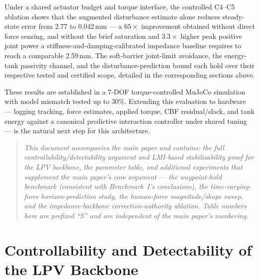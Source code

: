 \documentclass[journal]{IEEEtran}
\begin{document}
Under a shared actuator budget and torque interface, the controlled C4--C5
ablation shows that the augmented disturbance estimate alone reduces
steady-state error from 2.77 to 0.042\,mm --- a $65\times$ improvement
obtained without direct force sensing, and without the brief saturation and
$3.3\times$ higher peak positive joint power a stiffness-and-damping-calibrated impedance baseline requires
to reach a comparable 2.59\,mm. The soft-barrier joint-limit avoidance, the
energy-tank passivity channel, and the disturbance-prediction bound each hold
over their respective tested and certified scope, detailed in the
corresponding sections above.

These results are established in a 7-DOF torque-controlled MuJoCo simulation
with model mismatch tested up to $30\%$. Extending this evaluation to
hardware --- logging tracking, force estimates, applied torque, CBF
residual/slack, and tank energy against a canonical predictive interaction
controller under shared tuning --- is the natural next step for this
architecture.


\clearpage
\setcounter{section}{0}
\setcounter{table}{0}
\setcounter{figure}{0}
\setcounter{theorem}{0}
\setcounter{remark}{0}
\renewcommand{\thesection}{S\arabic{section}}
\renewcommand{\thetable}{S\arabic{table}}
\renewcommand{\thefigure}{S\arabic{figure}}
\renewcommand{\thetheorem}{S\arabic{theorem}}
\renewcommand{\theremark}{S\arabic{remark}}

\begin{quote}
\small\itshape
This document accompanies the main paper and contains: the full
controllability/detectability argument and LMI-based stabilizability
proof for the LPV backbone, the parameter table, and additional
experiments that supplement the main
paper's core argument --- the waypoint-hold benchmark (consistent with
Benchmark~I's conclusions), the time-varying-force horizon-prediction
study, the human-force magnitude/shape sweep, and the impedance-backbone
correction-authority ablation. Table numbers here are prefixed ``S'' and
are independent of the main paper's numbering.
\end{quote}

\section{Controllability and Detectability of the LPV Backbone}\label{sec:controllability}
\end{document}
